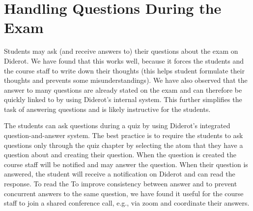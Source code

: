 \section{Handling Questions During the Exam}
\label{sec:quiz::handling-questions-during-the-exam}

\begin{cluster}
\label{grp:grm:quiz::students}

\begin{gram}
\label{grm:quiz::students}
Students may ask (and receive answers to) their questions about the
exam on Diderot.
We have found that this works well, because it forces the students and
the course staff to write down their thoughts (this helps student
formulate their thoughts and prevents some misunderstandings).
We have also observed that the answer to many questions are already
stated on the exam and can therefore be quickly linked to by using
Diderot's internal  system.
This further simplifies the task of answering questions and is likely
instructive for the students.

\end{gram}
\end{cluster}

\begin{cluster}
\label{grp:grm:quiz::questions}

\begin{gram}
\label{grm:quiz::questions}
The students can ask questions during a quiz by using Diderot's
integrated question-and-answer system.
The best practice is to require the students to ask questions only
through the quiz chapter by selecting the atom that they have a
question about and creating their question.
When the question is created the course staff will be notified and may answer the question. 
When their question is answered, the student will receive a notification on Diderot and can read the response.
To read the 
To improve consistency between answer and to prevent concurrent answers to the same question, we have found it useful for the course staff to join a shared conference call, e.g., via zoom and coordinate their answers. 

\end{gram}
\end{cluster}

